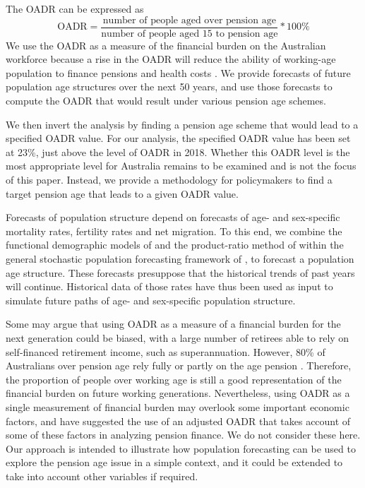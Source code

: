 \documentclass[11pt,a4paper,]{article}
\begin{document}
The OADR can be expressed as
\begin{equation}
  \text{OADR} = \frac{\text{number of people aged over pension age}}{\text{number of people aged 15 to pension age}}*100\%
\end{equation}
We use the OADR as a measure of the financial burden on the Australian workforce because a rise in the OADR will reduce the ability of working-age population to finance pensions and health costs \autocite{ARW07,IGR02,IGR07}.
We provide forecasts of future population age structures over the next 50 years, and use those forecasts to compute the OADR that would result under various pension age schemes.

We then invert the analysis by finding a pension age scheme that would lead to a specified OADR value. For our analysis, the specified OADR value has been set at 23\%, just above the level of OADR in 2018. Whether this OADR level is the most appropriate level for Australia remains to be examined and is not the focus of this paper. Instead, we provide a methodology for policymakers to find a target pension age that leads to a given OADR value.

Forecasts of population structure depend on forecasts of age- and sex-specific mortality rates, fertility rates and net migration. To this end, we combine the functional demographic models of \textcite{HU07} and the product-ratio method of \textcite{HBY13} within the general stochastic population forecasting framework of \textcite{HB08}, to forecast a population age structure. These forecasts presuppose that the historical trends of past years will continue. Historical data of those rates have thus been used as input to simulate future paths of age- and sex-specific population structure.

Some may argue that using OADR as a measure of a financial burden for the next generation could be biased, with a large number of retirees able to rely on self-financed retirement income, such as superannuation. However, 80\% of Australians over pension age rely fully or partly on the age pension \autocite{Power14}. Therefore, the proportion of people over working age is still a good representation of the financial burden on future working generations. Nevertheless, using OADR as a single measurement of financial burden may overlook some important economic factors, and \textcite{HY12} have suggested the use of an adjusted OADR that takes account of some of these factors in analyzing pension finance. We do not consider these here. Our approach is intended to illustrate how population forecasting can be used to explore the pension age issue in a simple context, and it could be extended to take into account other variables if required.
\end{document}
